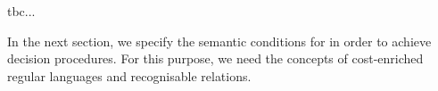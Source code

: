 {tbc...


In the next section, we specify the semantic conditions for {\slint} in order to achieve decision procedures. For this purpose, we need the concepts of cost-enriched regular languages and recognisable relations. 

}
